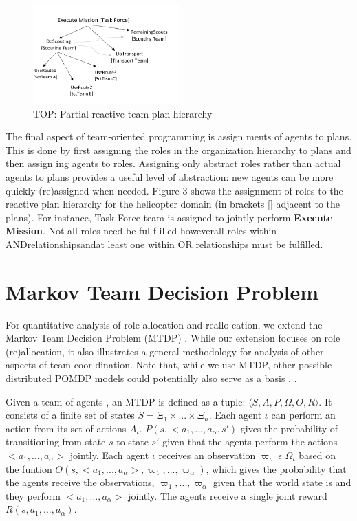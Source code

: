 \documentclass{IEEEtran}
\begin{document}
\begin{figure}[htb]
        \centering
        \includegraphics[width=0.5\textwidth]{figure0003.pdf}
        \caption{TOP: Partial reactive team plan hierarchy}
        \label{fig:0003}
        \end{figure}

 The final aspect of team-oriented programming is assign
ments of agents to plans. This is done by first assigning the
 roles in the organization hierarchy to plans and then assign
ing agents to roles. Assigning only abstract roles rather than
 actual agents to plans provides a useful level of abstraction:
 new agents can be more quickly (re)assigned when needed.
 Figure 3 shows the assignment of roles to the reactive plan
 hierarchy for the helicopter domain (in brackets [] adjacent
 to the plans). For instance, Task Force team is assigned to
 jointly perform {\bfseries Execute Mission}. Not all roles need be ful
f
 illed howeverall roles within ANDrelationshipsandat least
 one within OR relationships must be fulfilled.

 \section{\bfseries{Markov Team Decision Problem}}

 For quantitative analysis of role allocation and reallo
cation, we extend the Markov Team Decision Problem
 (MTDP) \cite{Pynadath}. While our extension
 focuses on role (re)allocation, it also illustrates a general
 methodology for analysis of other aspects of team coor
dination. Note that, while we use MTDP, other possible
 distributed POMDP models could potentially also serve as
 a basis \cite{Bernstein}, \cite{Xuan}.

  Given a team of agents , an MTDP \cite{Pynadath} is defined as a tuple: $\langle S,A,P,\Omega,O,R \rangle$.  It consists of a finite set of states
  $S=\Xi_1 \times ... \times \Xi_n$. Each agent $\iota$ can perform an action from its set of actions  $A_\iota$. $P(s,<a_1,...,a_\alpha,s')$ gives the probability of transitioning from state $s$ to state $s'$ given that the agents perform the actions $<a_1,...,a_\alpha>$ jointly. Each agent $\iota$  receives an observation $\varpi_\iota$ $\epsilon$ $\Omega_\iota$ based on the funtion $O(s,<a_1,...,a_\alpha>,\varpi_1,...,\varpi_\alpha )$, which gives
the probability that the agents receive the observations, $\varpi_1,...,\varpi_\alpha$ given that the world state is and they perform $<a_1,...,a_\alpha>$ jointly. The agents receive a single joint reward $R(s,a_1,...,a_\alpha)$.
\end{document}
